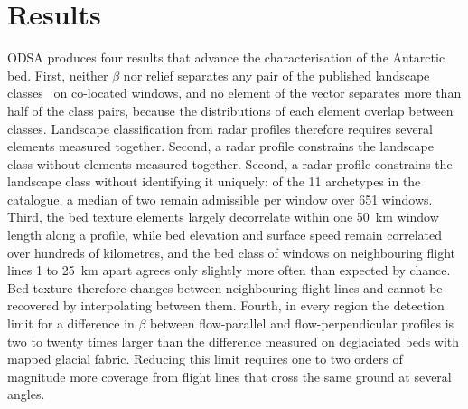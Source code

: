 \chapter{Results}

ODSA produces four results that advance the characterisation of the Antarctic bed. First,
neither $\beta$ nor relief separates any pair of the published landscape classes~\cite{Ockenden_2026} on co-located windows, and no element of the vector separates more than half of the class pairs, because the distributions of each element overlap between classes. Landscape classification from radar profiles therefore requires several elements measured together. Second, a radar profile constrains the landscape class without elements measured together. Second, a radar profile constrains the landscape class without identifying it uniquely: of the 11 archetypes in the catalogue, a median of two remain admissible per window over 651 windows. Third, the bed texture elements largely decorrelate within one 50~km window length along a profile, while bed elevation and surface speed remain correlated over hundreds of kilometres, and the bed class of windows on neighbouring flight lines 1 to 25~km apart agrees only slightly more often than expected by chance. Bed texture therefore changes between  neighbouring flight lines and cannot be recovered by interpolating between them. Fourth, in every region the detection limit for a difference in $\beta$ between flow-parallel and flow-perpendicular profiles is two to twenty times larger than the difference measured on deglaciated beds with mapped glacial fabric. Reducing this limit requires one to two orders of magnitude more coverage from flight lines that cross the same ground at several angles.




